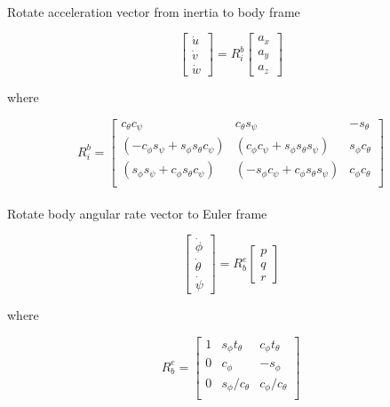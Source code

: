 \documentclass[]{article}
\begin{document}
\paragraph*{}
Rotate acceleration vector from inertia to body frame

\begin{equation}
\begin{bmatrix}
\dot{u} \\
\dot{v}\\
\dot{w}
\end{bmatrix} = 
R_{i}^{b}
\begin{bmatrix}
a_x \\
a_y \\
a_z
\end{bmatrix}
\end{equation}

where 

\begin{equation}
R_{i}^b = 
\begin{bmatrix}
c_\theta c_\psi & c_\theta s_\psi & -s_\theta\\
(-c_\phi s_\psi + s_\phi s_\theta c_\psi) & (c_\phi c_\psi + s_\phi s_\theta s_\psi) & s_\phi c_\theta\\
(s_\phi s_\psi + c_\phi s_\theta c_\psi) & (-s_\phi c_\psi + c_\phi s_\theta s_\psi) & c_\phi c_\theta\\
\end{bmatrix}
\end{equation}

\paragraph*{}
Rotate body angular rate vector to Euler frame

\begin{equation}
\begin{bmatrix}
\dot{\phi} \\
\dot{\theta}\\
\dot{\psi}
\end{bmatrix} = 
R_{b}^{e}
\begin{bmatrix}
p \\
q \\
r
\end{bmatrix}
\end{equation}

where 

\begin{equation}
R_{b}^e = 
\begin{bmatrix}
1 & s_\phi t_\theta & c_\phi t_\theta\\
0 & c_\phi & -s_\phi\\
0 & s_\phi/c_\theta & c_\phi/c_\theta\\
\end{bmatrix}
\end{equation}
\end{document}
